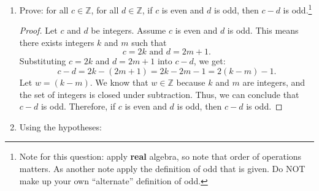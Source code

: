 \documentclass{article}
\begin{document}
\begin{enumerate}
          \newpage

    \item Prove: for all $c \in \mathbb{Z}$, for all $d \in \mathbb{Z}$, if $c$ is even
          and $d$ is odd, then $c-d$ is odd.\footnote{Note for this question: apply {\bf
                      real} algebra, so note that order of operations matters. As another note apply
              the definition of odd that is given. Do NOT make up your own ``alternate''
              definition of odd.}

          \begin{proof}
              Let $c$ and $d$ be integers. Assume $c$ is even and $d$ is odd. This means there exists integers $k$ and $m$ such that
              \[
              c = 2k \text{ and } d = 2m + 1.
            \]
              Substituting $c = 2k$ and $d = 2m + 1$ into $c - d$, we get:
              \[
              c - d = 2k - (2m + 1) = 2k - 2m - 1 = 2(k - m) - 1.
              \]
              Let $w = (k - m).$ We know that $w \in \mathbb{Z}$ because $k$ and $m$ are integers, and the set of integers is closed under subtraction. Thus, we can conclude that $c - d$ is odd. Therefore, if $c$ is even and $d$ is odd, then $c - d$ is odd.
          \end{proof}

          \newpage

    \item Using the hypotheses:


\end{enumerate}
\end{document}
